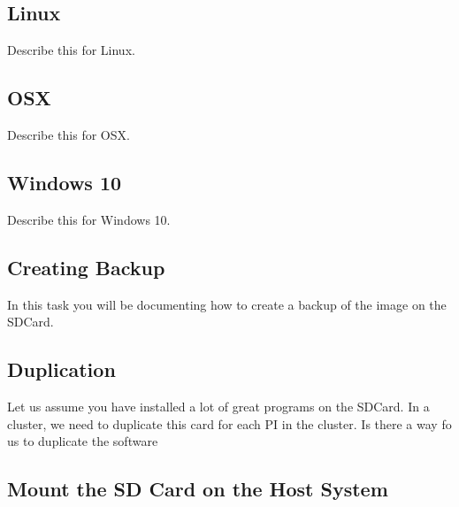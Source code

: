 \subsection{Linux}


\begin{exercise}
Describe this for Linux.
\end{exercise}

\subsection{OSX}


\begin{exercise}
Describe this for OSX.
\end{exercise}


\subsection{Windows 10}

\begin{exercise}
Describe this for Windows 10.
\end{exercise}


\subsection{Creating Backup}


\begin{exercise}
In this task you will be documenting how to create a backup of the
image on the SDCard.
\end{exercise}

\subsection{Duplication}


\begin{exercise}
Let us assume you have installed a lot of great programs on the
SDCard. In a cluster, we need to duplicate this card for each PI in
the cluster. Is there a way fo us to duplicate the software
\end{exercise}

\subsection{Mount the SD Card on the Host System}

